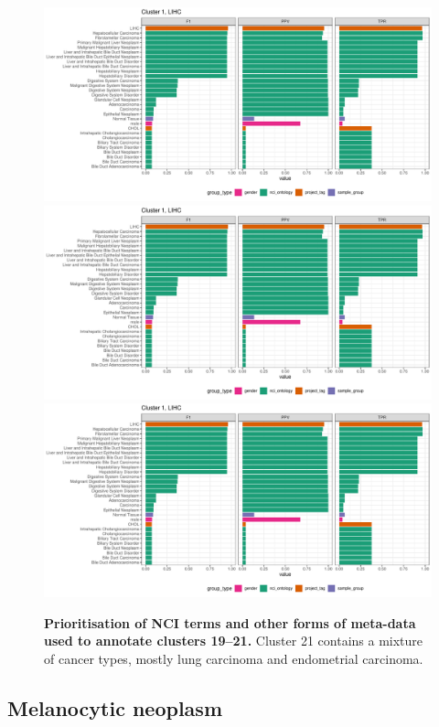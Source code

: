 \begin{figure}[H]
	\centering
	\includegraphics[width=.95\linewidth,page=19]{fig/tcga/cluster_labelling.pdf}
	\includegraphics[width=.95\linewidth,page=20]{fig/tcga/cluster_labelling.pdf}
	\includegraphics[width=.95\linewidth,page=21]{fig/tcga/cluster_labelling.pdf}
	\caption{
		\textbf{Prioritisation of NCI terms and other forms of meta-data used to annotate clusters 19--21.} 
		Cluster 21 contains a mixture of cancer types, mostly lung carcinoma and endometrial carcinoma.
	}
	\label{fig:cluslab7}
\end{figure}


\subsection{Melanocytic neoplasm}

